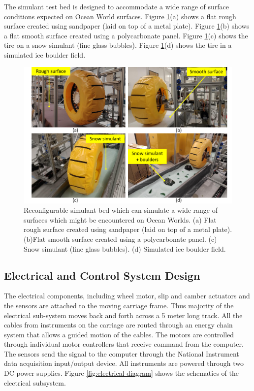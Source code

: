 \documentclass{article}
\begin{document}
The simulant test bed is designed to accommodate a wide range of surface conditions expected on Ocean World surfaces. Figure \ref{fig:simulants}(a) shows a flat rough surface created using sandpaper (laid on top of a metal plate).  Figure \ref{fig:simulants}(b) shows a flat smooth surface created using a polycarbonate panel. Figure \ref{fig:simulants}(c) shows the tire on a snow simulant (fine glass bubbles). Figure \ref{fig:simulants}(d) shows the tire in a simulated ice boulder field. 
\begin{figure}[hbt!]
\centering
\includegraphics[width=6.00in]{test-rig-images/simulants.pdf}
\caption{Reconfigurable simulant bed which can simulate a wide range of surfaces which might be encountered on Ocean Worlds. (a) Flat rough surface created using sandpaper (laid on top of a metal plate).  (b)Flat smooth surface created using a polycarbonate panel. (c) Snow simulant (fine glass bubbles). (d) Simulated ice boulder field. }
\label{fig:simulants}
\end{figure}

\subsection{Electrical and Control System Design}

The electrical components, including wheel motor, slip and camber actuators and the sensors are attached to the moving carriage frame. Thus majority of the electrical sub-system moves back and forth across a 5 meter long track. All the cables from instruments on the carriage are routed through an energy chain system that allows a guided motion of the cables. The motors are controlled through individual motor controllers that receive command from the computer. The sensors send the signal to the computer through the National Instrument data acquisition input/output device. All instruments are powered through two DC power supplies. Figure \ref{fig:electrical-diagram} shows the schematics of the electrical subsystem. 
\end{document}
